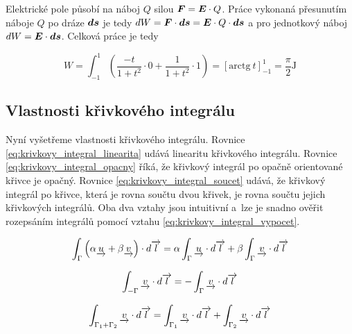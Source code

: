 Elektrické pole působí na náboj \(Q\) silou \(\boldsymbol{F} = \boldsymbol{E} \cdot Q\). Práce vykonaná přesunutím náboje \(Q\) po dráze \(\boldsymbol{ds}\) je tedy \(dW = \boldsymbol{F} \cdot \boldsymbol{ds} = \boldsymbol{E} \cdot Q \cdot \boldsymbol{ds}\) a pro jednotkový náboj \(dW = \boldsymbol{E} \cdot \boldsymbol{ds}\). Celková práce je tedy

\[
W = \int_{-1}^1 \left (\frac{-t}{1 + t^2} \cdot 0 + \frac{1}{1 + t^2} \cdot 1 \right) = \left[\mathrm{arctg} \ t\right]_{-1}^1 = \frac{\pi}{2} \mathrm{J}
\]

\subsection{Vlastnosti křivkového integrálu}

Nyní vyšetřeme vlastnosti křivkového integrálu. Rovnice \eqref{eq:krivkovy_integral_linearita} udává linearitu křivkového integrálu. Rovnice \eqref{eq:krivkovy_integral_opacny} říká, že křivkový integrál po opačně orientované křivce je opačný. Rovnice \eqref{eq:krivkovy_integral_soucet} udává, že křivkový integrál po křivce, která je rovna součtu dvou křivek, je rovna součtu jejich křivkových integrálů. Oba dva vztahy jsou intuitivní a~lze je snadno ověřit rozepsáním integrálů pomocí vztahu \eqref{eq:krivkovy_integral_vypocet}.

\begin{equation}
\label{eq:krivkovy_integral_linearita}
\begin{split}
\int_{\Gamma} \left(\alpha \underrightarrow{u} + \beta \underrightarrow{v}\right) \cdot d\overrightarrow{l} = \alpha \int_{\Gamma} \underrightarrow{u} \cdot d\overrightarrow{l} + \beta \int_{\Gamma} \underrightarrow{v} \cdot d\overrightarrow{l}
\end{split}
\end{equation}

\begin{equation}
\label{eq:krivkovy_integral_opacny}
\begin{split}
\int_{-\Gamma} \underrightarrow{v} \cdot d\overrightarrow{l} = -\int_{\Gamma} \underrightarrow{v} \cdot d\overrightarrow{l}
\end{split}
\end{equation}

\begin{equation}
\label{eq:krivkovy_integral_soucet}
\begin{split}
\int_{\Gamma_1 + \Gamma_2} \underrightarrow{v} \cdot d\overrightarrow{l} = \int_{\Gamma_1} \underrightarrow{v} \cdot d\overrightarrow{l} + \int_{\Gamma_2} \underrightarrow{v} \cdot d\overrightarrow{l}
\end{split}
\end{equation}

